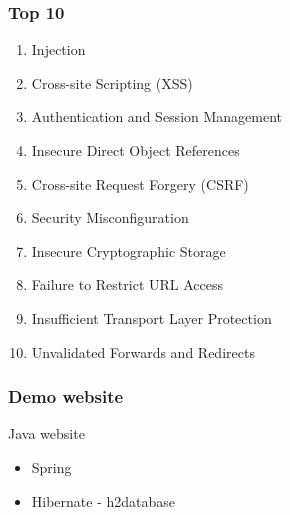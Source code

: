 \begin{frame}
\frametitle{Top 10}
\begin{enumerate}
\item Injection
\item Cross-site Scripting (XSS)
\item Authentication and Session Management
\item Insecure Direct Object References
\item Cross-site Request Forgery (CSRF)
\item Security Misconfiguration
\item Insecure Cryptographic Storage
\item Failure to Restrict URL Access
\item Insufficient Transport Layer Protection
\item Unvalidated Forwards and Redirects
\end{enumerate}
\end{frame}

\begin{frame}
\frametitle{Demo website}
\begin{description}
\Large
\item[Technologies]
	Java website
	\hfill
	\begin{itemize}
	\Large
	\item Spring
	\item Hibernate - h2database
	\end{itemize}
\end{description}
\end{frame}

